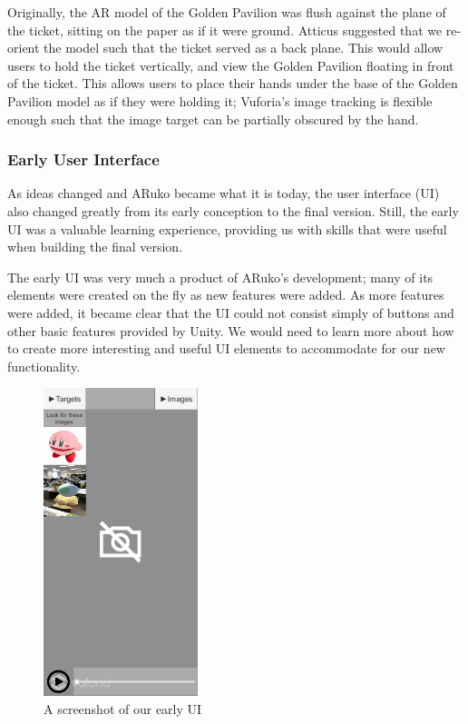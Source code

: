 \documentclass[a4paper, 10pt, american, titlepage]{article}
\begin{document}
Originally, the AR model of the Golden Pavilion was flush against the plane of
the ticket, sitting on the paper as if it were ground. Atticus suggested that we
re-orient the model such that the ticket served as a back plane. This would
allow users to hold the ticket vertically, and view the Golden Pavilion floating
in front of the ticket. This allows users to place their hands under the base of
the Golden Pavilion model as if they were holding it; Vuforia's image tracking
is flexible enough such that the image target can be partially obscured by the
hand.

\subsubsection{Early User Interface}
\label{sec:earlyUserInterface}

As ideas changed and ARuko became what it is today, the user interface (UI) also
changed greatly from its early conception to the final version. Still, the early
UI was a valuable learning experience, providing us with skills that were useful
when building the final version.

The early UI was very much a product of ARuko's development; many of its
elements were created on the fly as new features were added. As more features
were added, it became clear that the UI could not consist simply of buttons and
other basic features provided by Unity. We would need to learn more about how to
create more interesting and useful UI elements to accommodate for our new
functionality.

\begin{figure}[h]
	\centering
	\includegraphics[width=0.4\textwidth]{old-ui.png}
	\caption{A screenshot of our early UI}
	\label{fig:oldUI}
\end{figure}
\end{document}
